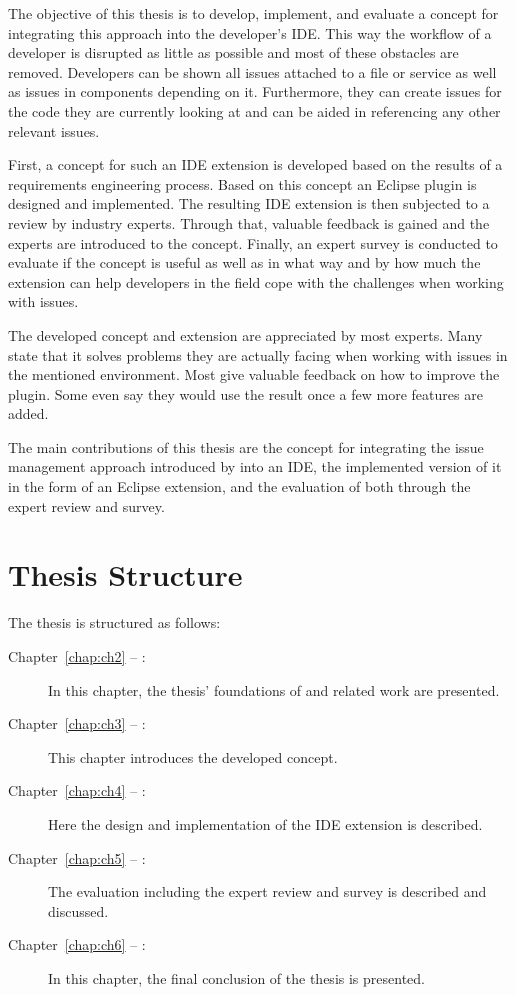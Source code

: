 The objective of this thesis is to develop, implement, and evaluate a concept for integrating this approach into the developer's \gls{IDE}.
This way the workflow of a developer is disrupted as little as possible and most of these obstacles are removed.
Developers can be shown all issues attached to a file or service as well as issues in components depending on it.
Furthermore, they can create issues for the code they are currently looking at and can be aided in referencing any other relevant issues. 

First, a concept for such an \gls{IDE} extension is developed based on the results of a requirements engineering process.
Based on this concept an \gls{Eclipse} plugin is designed and implemented.
The resulting \gls{IDE} extension is then subjected to a review by industry experts.
Through that, valuable feedback is gained and the experts are introduced to the concept.
Finally, an expert survey is conducted to evaluate if the concept is useful 
as well as in what way and by how much the extension can help developers in the field cope with the challenges when working with issues.

The developed concept and extension are appreciated by most experts.
Many state that it solves problems they are actually facing when working with issues in the mentioned environment.
Most give valuable feedback on how to improve the plugin.
Some even say they would use the result once a few more features are added.

The main contributions of this thesis are the concept for integrating the issue management approach introduced by \cite{Speth2019} into an \gls{IDE},
the implemented version of it in the form of an \gls{Eclipse} extension, and the evaluation of both through the expert review and survey.

\section*{Thesis Structure}
The thesis is structured as follows:
\begin{description}
	\item[Chapter~\ref{chap:ch2} -- :] In this chapter, the thesis' foundations of and related work are presented.
	\item[Chapter~\ref{chap:ch3} -- :] This chapter introduces the developed concept.
	\item[Chapter~\ref{chap:ch4} -- :] Here the design and implementation of the \gls{IDE} extension is described.
	\item[Chapter~\ref{chap:ch5} -- :] The evaluation including the expert review and survey is described and discussed.
	\item[Chapter~\ref{chap:ch6} -- :] In this chapter, the final conclusion of the thesis is presented.
\end{description}